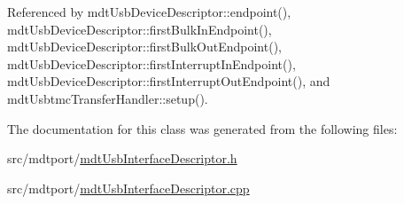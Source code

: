 Referenced by mdt\-Usb\-Device\-Descriptor\-::endpoint(), mdt\-Usb\-Device\-Descriptor\-::first\-Bulk\-In\-Endpoint(), mdt\-Usb\-Device\-Descriptor\-::first\-Bulk\-Out\-Endpoint(), mdt\-Usb\-Device\-Descriptor\-::first\-Interrupt\-In\-Endpoint(), mdt\-Usb\-Device\-Descriptor\-::first\-Interrupt\-Out\-Endpoint(), and mdt\-Usbtmc\-Transfer\-Handler\-::setup().



The documentation for this class was generated from the following files\-:\begin{DoxyCompactItemize}
\item 
src/mdtport/\hyperlink{mdt_usb_interface_descriptor_8h}{mdt\-Usb\-Interface\-Descriptor.\-h}\item 
src/mdtport/\hyperlink{mdt_usb_interface_descriptor_8cpp}{mdt\-Usb\-Interface\-Descriptor.\-cpp}\end{DoxyCompactItemize}
